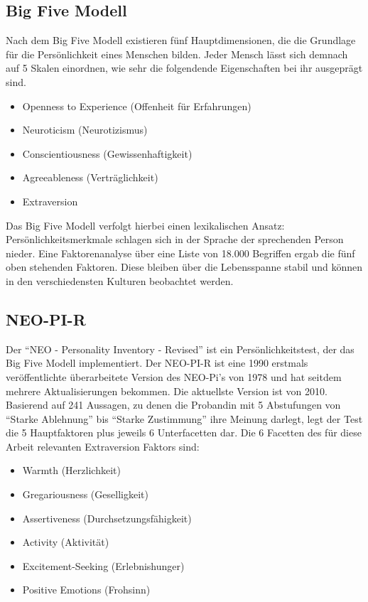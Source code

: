 \subsection{Big Five Modell}

Nach dem Big Five Modell existieren fünf Hauptdimensionen, die die Grundlage für die Persönlichkeit eines Menschen bilden.
Jeder Mensch lässt sich demnach auf 5 Skalen einordnen, wie sehr die folgendende Eigenschaften bei ihr ausgeprägt sind.

\begin{itemize}
  \item Openness to Experience (Offenheit für Erfahrungen)
  \item Neuroticism (Neurotizismus)
  \item Conscientiousness (Gewissenhaftigkeit)
  \item Agreeableness (Verträglichkeit)
  \item Extraversion
\end{itemize}

Das Big Five Modell verfolgt hierbei einen lexikalischen Ansatz: 
Persönlichkeitsmerkmale schlagen sich in der Sprache der sprechenden Person nieder.
Eine Faktorenanalyse über eine Liste von 18.000 Begriffen ergab die fünf oben stehenden Faktoren.
Diese bleiben über die Lebensspanne stabil und können in den verschiedensten Kulturen beobachtet werden.

\subsection{NEO-PI-R}

Der "`NEO - Personality Inventory - Revised"' ist ein Persönlichkeitstest, der das Big Five Modell implementiert.
Der NEO-PI-R ist eine 1990 erstmals veröffentlichte überarbeitete Version des NEO-Pi's von 1978 und hat seitdem mehrere Aktualisierungen bekommen. Die aktuellste Version ist von 2010.
Basierend auf 241 Aussagen, zu denen die Probandin mit 5 Abstufungen von "`Starke Ablehnung"' bis "`Starke Zustimmung"' ihre Meinung darlegt, legt der Test die 5 Hauptfaktoren plus jeweils 6 Unterfacetten dar.
Die 6 Facetten des für diese Arbeit relevanten Extraversion Faktors sind:

\begin{itemize}
  \item Warmth (Herzlichkeit)
  \item Gregariousness (Geselligkeit)
  \item Assertiveness (Durchsetzungsfähigkeit)
  \item Activity (Aktivität)
  \item Excitement-Seeking (Erlebnishunger)
  \item Positive Emotions (Frohsinn)
\end{itemize}

